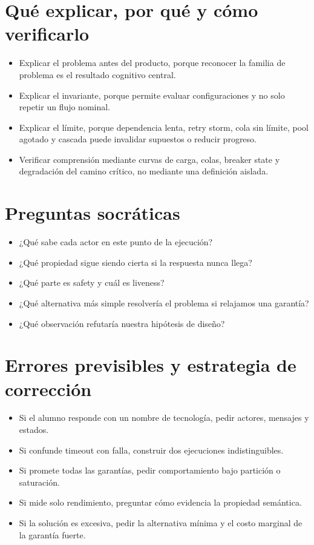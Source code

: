 \documentclass[variant=docente,cover=institutional,mode=screen]{ua-engineering-v6-article}
\begin{document}
\section{Qué explicar, por qué y cómo verificarlo}
\begin{itemize}
\item Explicar el problema antes del producto, porque reconocer la familia de problema es el resultado cognitivo central.
\item Explicar el invariante, porque permite evaluar configuraciones y no solo repetir un flujo nominal.
\item Explicar el límite, porque dependencia lenta, retry storm, cola sin límite, pool agotado y cascada puede invalidar supuestos o reducir progreso.
\item Verificar comprensión mediante curvas de carga, colas, breaker state y degradación del camino crítico, no mediante una definición aislada.
\end{itemize}

\section{Preguntas socráticas}
\begin{itemize}
\item ¿Qué sabe cada actor en este punto de la ejecución?
\item ¿Qué propiedad sigue siendo cierta si la respuesta nunca llega?
\item ¿Qué parte es safety y cuál es liveness?
\item ¿Qué alternativa más simple resolvería el problema si relajamos una garantía?
\item ¿Qué observación refutaría nuestra hipótesis de diseño?
\end{itemize}

\section{Errores previsibles y estrategia de corrección}
\begin{itemize}
\item Si el alumno responde con un nombre de tecnología, pedir actores, mensajes y estados.
\item Si confunde timeout con falla, construir dos ejecuciones indistinguibles.
\item Si promete todas las garantías, pedir comportamiento bajo partición o saturación.
\item Si mide solo rendimiento, preguntar cómo evidencia la propiedad semántica.
\item Si la solución es excesiva, pedir la alternativa mínima y el costo marginal de la garantía fuerte.
\end{itemize}
\end{document}
